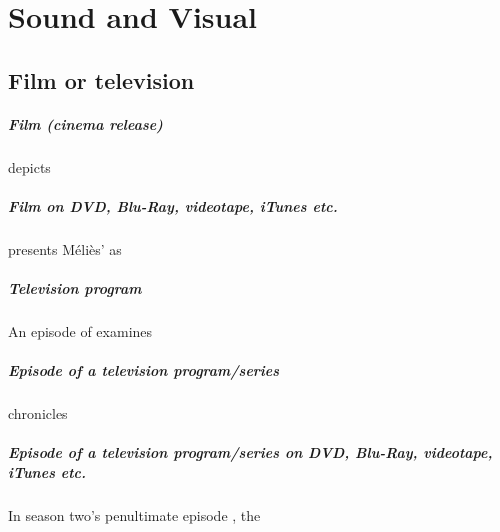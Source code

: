 \documentclass[a4paper,australian,oneside,12pt,footlines=3]{scrbook}%
\theoremstyle{remark}
\begin{document}
\chapter{Sound and Visual}
\begin{refsection}
\section{Film or television}
\paragraph{Film (cinema release)}
\nocite{TheMaster}
\textcite{DjangoMovie} depicts\textelp{}

\paragraph{Film on DVD, Blu-Ray, videotape, iTunes etc.}
\textcite{Hugo} presents Méliès' as\textelp{}

\paragraph{Television program}
An episode of \textcite{Dateline} examines\textelp{}

\paragraph{Episode of a television program/series}
\nocite{Coulter2010}
\textcite{56up} chronicles\textelp{}

\paragraph{Episode of a television program/series on DVD, Blu-Ray, videotape, iTunes etc.}
In season two’s penultimate episode \textcite{GameOfThrones}, the\textelp{}
\printbibliography[heading=subbibliography]
\end{refsection}
\end{document}
